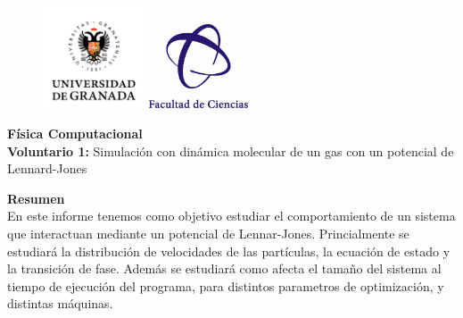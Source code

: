 \documentclass[11pt, twoside]{article} %
\begin{document}
\begin{figure}[h!]
	\includegraphics[width=3cm]{Icons/ugr.jpg}
	\endminipage
	\includegraphics[height = 2.5cm, width=3cm]{Icons/facultad_ciencias.png}
	\endminipage
\end{figure}

\vspace{0.3cm}

\begin{center}
    \Huge \textbf{Física Computacional}\\
    		\vspace{0.4cm}
    \LARGE \textbf{Voluntario 1:}  
    Simulación con dinámica molecular de un gas con un potencial de Lennard-Jones
\end{center}

\vspace{1cm}

\vspace{1cm}

\begin{center}
    \large \textbf{Resumen}\\
    		\vspace{0.2cm}
    \normalsize
    En este informe tenemos como objetivo estudiar el comportamiento de un sistema que
    interactuan mediante un potencial de Lennar-Jones. Princialmente se estudiará 
    la distribución de velocidades de las partículas, la ecuación de estado y la 
    transición de fase. Además se estudiará como afecta el tamaño del sistema al tiempo
    de ejecución del programa, para distintos parametros de optimización, y distintas
    máquinas.

\end{center}

\vspace{1cm}
\end{document}
